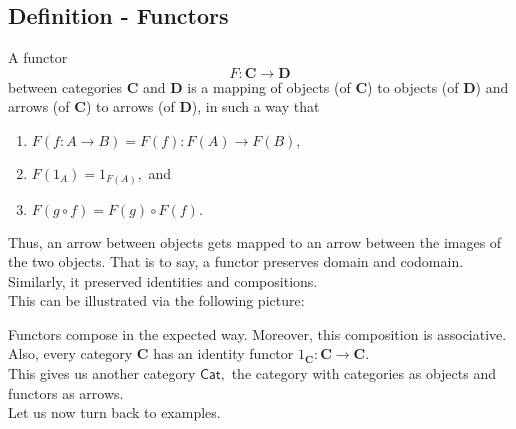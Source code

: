 \subsection{Definition - Functors}
\begin{defn} 
	A functor \[F:\mathbf{C} \to \mathbf{D}\] between categories $\mathbf{C}$ and $\mathbf{D}$ is a mapping of objects (of $\mathbf{C}$) to objects (of $\mathbf{D}$) and arrows (of $\mathbf{C}$) to arrows (of $\mathbf{D}$), in such a way that
	\begin{enumerate}
		\item $F(f:A\to B) = F(f):F(A)\to F(B),$
		\item $F(1_A) = 1_{F(A)},$ and
		\item $F(g\circ f) = F(g)\circ F(f).$
	\end{enumerate}
\end{defn}
Thus, an arrow between objects gets mapped to an arrow between the images of the two objects. That is to say, a functor preserves domain and codomain. Similarly, it preserved identities and compositions.\\
This can be illustrated via the following picture:
\begin{center}
\end{center}
Functors compose in the expected way. Moreover, this composition is associative. Also, every category $\mathbf{C}$ has an identity functor $1_{\mathbf{C}} : \mathbf{C} \to \mathbf{C}.$\\
This gives us another category $\mathsf{Cat},$ the category with categories as objects and functors as arrows.\\
Let us now turn back to examples.

